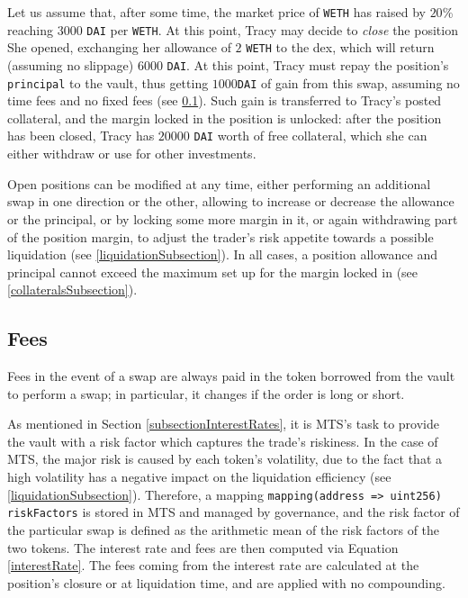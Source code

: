\documentclass [10pt, fancyhdr, twoside] {article}
\begin{document}
Let us assume that, after some time, the market price of \verb|WETH| has raised by $20$\% reaching $3000$ \verb|DAI| per \verb|WETH|. At this point, Tracy may decide to \emph{close} the position She opened, exchanging her allowance of $2$ \verb|WETH| to the dex, which will return (assuming no slippage) $6000$ \verb|DAI|. At this point, Tracy must repay the position's \verb|principal| to the vault, thus getting $1000$\verb|DAI| of gain from this swap, assuming no time fees and no fixed fees (see \ref{feeSubsection}). Such gain is transferred to Tracy's posted collateral, and the margin locked in the position is unlocked: after the position has been closed, Tracy has $20000$ \verb|DAI| worth of free collateral, which she can either withdraw or use for other investments.

Open positions can be modified at any time, either performing an additional swap in one direction or the other, allowing to increase or decrease the allowance or the principal, or by locking some more margin in it, or again withdrawing part of the position margin, to adjust the trader's risk appetite towards a possible liquidation (see \ref{liquidationSubsection}). In all cases, a position allowance and principal cannot exceed the maximum set up for the margin locked in (see \ref{collateralsSubsection}).

\subsection{Fees}\label{feeSubsection}

Fees in the event of a swap are always paid in the token borrowed from the vault to perform a swap; in particular, it changes if the order is long or short.

As mentioned in Section \ref{subsectionInterestRates}, it is MTS's task to provide the vault with a risk factor which captures the trade's riskiness. In the case of MTS, the major risk is caused by each token's volatility, due to the fact that a high volatility has a negative impact on the liquidation efficiency (see \ref{liquidationSubsection}). Therefore, a mapping \verb|mapping(address => uint256) riskFactors| is stored in MTS and managed by governance, and the risk factor of the particular swap is defined as the arithmetic mean of the risk factors of the two tokens. The interest rate and fees are then computed via Equation \eqref{interestRate}. The fees coming from the interest rate are calculated at the position's closure or at liquidation time, and are applied with no compounding.
\end{document}
